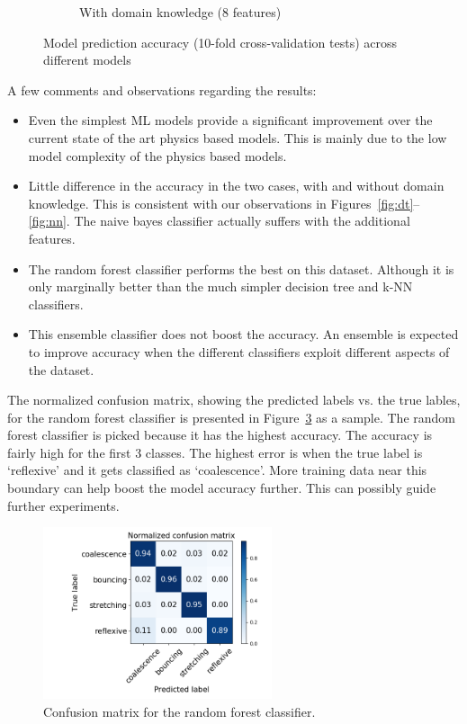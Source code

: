 \documentclass{article}
\begin{document}
\begin{figure}[h!]
\begin{subfigure}[b]{0.45\textwidth}
        \caption{With domain knowledge (8  features)}
        \label{fig:tiger}
    \end{subfigure}
    \caption{Model prediction accuracy (10-fold cross-validation tests) across different models}\label{fig:tuned}
\end{figure}


A few comments and observations regarding the results:
\begin{itemize}
\item Even the simplest ML models provide a significant improvement over the current state of the art physics based models. This is mainly due to the low model complexity of the physics based models.
\item Little difference in the accuracy in the two cases, with and without domain knowledge. This is consistent with our observations in Figures~\ref{fig:dt}--\ref{fig:nn}. The naive bayes classifier actually suffers with the additional features.
\item The random forest classifier performs the best on this dataset. Although it is only marginally better than the much simpler decision tree and k-NN classifiers.
\item This ensemble classifier does not boost the accuracy. An ensemble is expected to improve accuracy when the different classifiers exploit different aspects of the dataset.
\end{itemize}


The normalized confusion matrix, showing the predicted labels vs. the true lables, for the random forest classifier is presented in Figure~\ref{fig:conf} as a sample. The random forest classifier is picked because it has the highest accuracy. The accuracy is fairly high for the first 3 classes. The highest error is when the true label is `reflexive' and it gets classified as `coalescence'. More training data near this boundary can help boost the model accuracy further. This can possibly guide further experiments.
\begin{figure}[h]
	\centering
	\includegraphics[width=0.6\textwidth]{../figures/conf_mat.png}
	\caption{Confusion matrix for the random forest classifier.}
	\label{fig:conf}
\end{figure}
\end{document}
